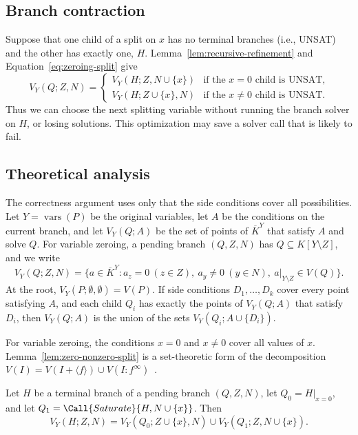 \subsection{Branch contraction}
\label{subsec:zeroing-branch-contraction}

Suppose that one child of a split on $x$ has no terminal branches
(i.e., UNSAT) and the other has exactly one, $H$.
Lemma~\ref{lem:recursive-refinement} and Equation~\eqref{eq:zeroing-split} give
\[
  V_Y(Q;Z,N)=
  \begin{cases}
    V_Y(H;Z,N\cup\{x\}) & \text{if the $x=0$ child is UNSAT,}\\
    V_Y(H;Z\cup\{x\},N) & \text{if the $x\neq0$ child is UNSAT.}
  \end{cases}
\]
Thus we can choose the next splitting variable without running the
branch solver on $H$, or losing solutions.
This optimization may save a solver call that is likely to fail.

\subsection{Theoretical analysis}
\label{subsec:zeroing-theoretical-analysis}

The correctness argument uses only that the side conditions cover all
possibilities. Let $Y=\operatorname{vars}(P)$ be the original variables, let
$A$ be the conditions on the current branch, and let $V_Y(Q;A)$ be the set of
points of $\overline K^{Y}$ that satisfy $A$ and solve $Q$. For variable
zeroing, a pending branch $(Q,Z,N)$ has $Q\subseteq K[Y\setminus Z]$, and we
write
\[
  V_Y(Q;Z,N)=\bigl\{a\in\overline K^{Y}:
    a_z=0\ (z\in Z),\ a_y\neq0\ (y\in N),\
  a|_{Y\setminus Z}\in V(Q)\bigr\}.
\]
At the root, $V_Y(P;\emptyset,\emptyset)=V(P)$. If side conditions
$D_1,\ldots,D_k$ cover every point satisfying $A$, and each child $Q_i$ has
exactly the points of $V_Y(Q;A)$ that satisfy $D_i$, then $V_Y(Q;A)$ is the
union of the sets $V_Y(Q_i;A\cup\{D_i\})$.

For variable zeroing, the conditions $x=0$ and $x\neq0$ cover all values of
$x$. Lemma~\ref{lem:zero-nonzero-split} is a set-theoretic form of the
decomposition $V(I)=V(I+\langle f\rangle)\cup
V(I:f^\infty)$~\cite[Ch.~4, \S4]{cox2015ideals}.

\begin{lemma}
  \label{lem:zero-nonzero-split}
  Let $H$ be a terminal branch of a pending branch $(Q,Z,N)$, let
  $Q_0=H|_{x=0}$, and let $Q_1=\Call{Saturate}{H,N\cup\{x\}}$. Then
  \begin{equation}
    \label{eq:zeroing-split}
    V_Y(H;Z,N)=V_Y(Q_0;Z\cup\{x\},N)
    \cup V_Y(Q_1;Z,N\cup\{x\}).
  \end{equation}
\end{lemma}

